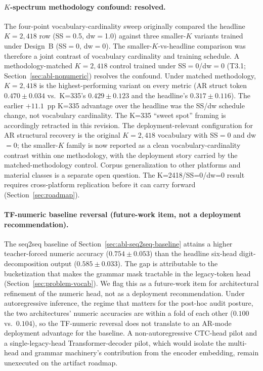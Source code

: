 \documentclass[sensors,article,submit,moreauthors,pdftex]{Definitions/mdpi}
\begin{document}
\paragraph{$K$-spectrum methodology confound: resolved.} The four-point vocabulary-cardinality sweep originally compared the headline $K\!=\!2{,}418$ row (SS$=$0.5, dw$=$1.0) against three smaller-$K$ variants trained under Design~B (SS$=$0, dw$=$0). The smaller-$K$-vs-headline comparison was therefore a joint contrast of vocabulary cardinality and training schedule. A methodology-matched $K\!=\!2{,}418$ control trained under SS$=$0/dw$=$0 (T3.1; Section~\ref{sec:abl-nonumeric}) resolves the confound. Under matched methodology, $K\!=\!2{,}418$ is the highest-performing variant on every metric (AR struct token $0.470 \pm 0.034$ vs.\ K=335's $0.429 \pm 0.123$ and the headline's $0.317 \pm 0.116$). The earlier $+11.1$~pp K=335 advantage over the headline was the SS/dw schedule change, not vocabulary cardinality. The K=335 ``sweet spot'' framing is accordingly retracted in this revision. The deployment-relevant configuration for AR structural recovery is the original $K\!=\!2{,}418$ vocabulary with SS$=$0 and dw$=$0; the smaller-$K$ family is now reported as a clean vocabulary-cardinality contrast within one methodology, with the deployment story carried by the matched-methodology control. Corpus generalization to other platforms and material classes is a separate open question. The K=2418/SS=0/dw=0 result requires cross-platform replication before it can carry forward (Section~\ref{sec:roadmap}).

\paragraph{TF-numeric baseline reversal (future-work item, not a deployment recommendation).} The seq2seq baseline of Section~\ref{sec:abl-seq2seq-baseline} attains a higher teacher-forced numeric accuracy ($0.754 \pm 0.053$) than the headline six-head digit-decomposition output ($0.585 \pm 0.033$). The gap is attributable to the bucketization that makes the grammar mask tractable in the legacy-token head (Section~\ref{sec:problem-vocab}). We flag this as a future-work item for architectural refinement of the numeric head, not as a deployment recommendation. Under autoregressive inference, the regime that matters for the post-hoc audit posture, the two architectures' numeric accuracies are within a fold of each other ($0.100$ vs.\ $0.104$), so the TF-numeric reversal does not translate to an AR-mode deployment advantage for the baseline. A non-autoregressive CTC-head pilot and a single-legacy-head Transformer-decoder pilot, which would isolate the multi-head and grammar machinery's contribution from the encoder embedding, remain unexecuted on the artifact roadmap.
\end{document}
